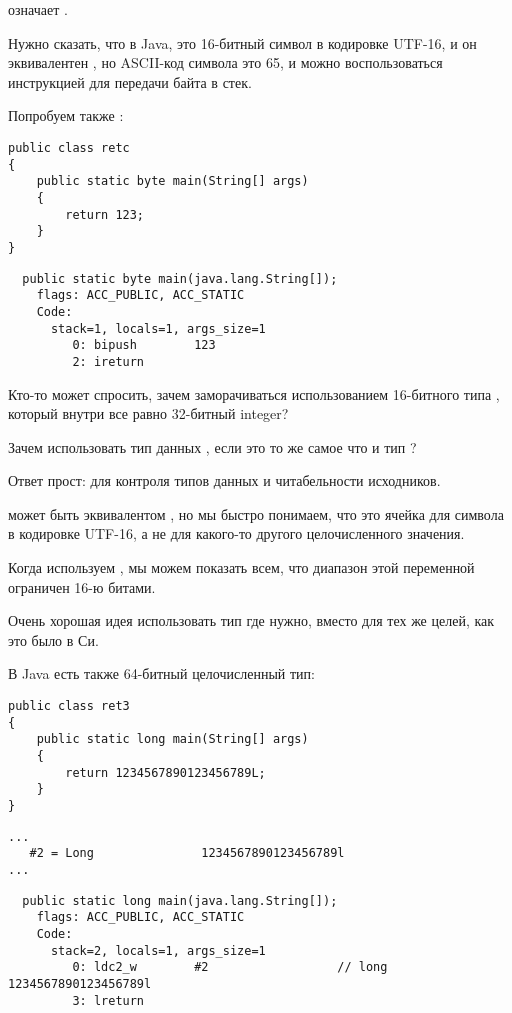 означает .

Нужно сказать, что  в Java, это 16-битный символ в кодировке UTF-16,
и он эквивалентен , но ASCII-код символа  это 65, и можно воспользоваться
инструкцией для передачи байта в стек.

Попробуем также :

\begin{lstlisting}[style=customjava]
public class retc
{
	public static byte main(String[] args) 
	{
		return 123;
	}
}
\end{lstlisting}

\begin{lstlisting}
  public static byte main(java.lang.String[]);
    flags: ACC_PUBLIC, ACC_STATIC
    Code:
      stack=1, locals=1, args_size=1
         0: bipush        123
         2: ireturn       
\end{lstlisting}

Кто-то может спросить, зачем заморачиваться использованием 16-битного типа , который
внутри все равно 32-битный integer?

Зачем использовать тип данных , если это то же самое что и тип ?

Ответ прост: для контроля типов данных и читабельности исходников.

 может быть эквивалентом , но мы быстро понимаем, что это ячейка
для символа в кодировке UTF-16, а не для какого-то другого целочисленного значения.

Когда используем , мы можем показать всем, что диапазон этой переменной 
ограничен 16-ю битами.

Очень хорошая идея использовать тип  где нужно, 
вместо  для тех же целей, как это было в Си.

В Java есть также 64-битный целочисленный тип:

\begin{lstlisting}[style=customjava]
public class ret3
{
	public static long main(String[] args)
	{
		return 1234567890123456789L;
	}
}
\end{lstlisting}

\begin{lstlisting}[caption=Constant pool]
...
   #2 = Long               1234567890123456789l
...
\end{lstlisting}

\begin{lstlisting}
  public static long main(java.lang.String[]);
    flags: ACC_PUBLIC, ACC_STATIC
    Code:
      stack=2, locals=1, args_size=1
         0: ldc2_w        #2                  // long 1234567890123456789l
         3: lreturn       
\end{lstlisting}


